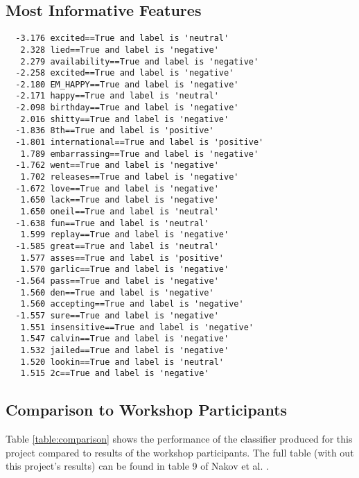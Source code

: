 \documentclass[final,3p,12pt]{elsarticle}
\begin{document}
\subsection{Most Informative Features}


\begin{verbatim}
  -3.176 excited==True and label is 'neutral'
   2.328 lied==True and label is 'negative'
   2.279 availability==True and label is 'negative'
  -2.258 excited==True and label is 'negative'
  -2.180 EM_HAPPY==True and label is 'negative'
  -2.171 happy==True and label is 'neutral'
  -2.098 birthday==True and label is 'negative'
   2.016 shitty==True and label is 'negative'
  -1.836 8th==True and label is 'positive'
  -1.801 international==True and label is 'positive'
   1.789 embarrassing==True and label is 'negative'
  -1.762 went==True and label is 'negative'
   1.702 releases==True and label is 'negative'
  -1.672 love==True and label is 'negative'
   1.650 lack==True and label is 'negative'
   1.650 oneil==True and label is 'neutral'
  -1.638 fun==True and label is 'neutral'
   1.599 replay==True and label is 'negative'
  -1.585 great==True and label is 'neutral'
   1.577 asses==True and label is 'positive'
   1.570 garlic==True and label is 'negative'
  -1.564 pass==True and label is 'negative'
   1.560 den==True and label is 'negative'
   1.560 accepting==True and label is 'negative'
  -1.557 sure==True and label is 'negative'
   1.551 insensitive==True and label is 'negative'
   1.547 calvin==True and label is 'negative'
   1.532 jailed==True and label is 'negative'
   1.520 lookin==True and label is 'neutral'
   1.515 2c==True and label is 'negative'
\end{verbatim}

\subsection{Comparison to Workshop Participants}

Table \ref{table:comparison} shows the performance of the classifier produced
for this project compared to results of the workshop participants. The full
table (with out this project's results) can be found in table 9 of Nakov et al.
\cite{Nakov2013}.
\end{document}
